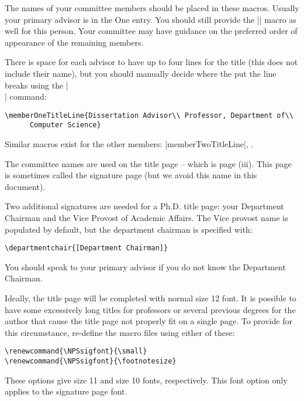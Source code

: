 The names of your committee members should be placed in these macros.  
Usually your primary advisor is in the One entry. You should still 
provide the |\thesisadvisor{[ADVISOR]}| macro as well for this person.  
Your committee may have guidance on the preferred order of appearance of the remaining members.  

There is space for each advisor to have up to four lines for the title 
(this does not include their name), but you should manually decide where 
the put the line breaks using the |\\| command:

\begin{Verbatim}
\memberOneTitleLine{Dissertation Advisor\\ Professor, Department of\\ 
      Computer Science}
\end{Verbatim}

Similar macros exist for the other members: |memberTwoTitleLine|, \etc.

The committee names are used on the title page -- which is page (iii).  This page is sometimes called the signature page (but we avoid this name in this document).

Two additional signatures are needed for a Ph.D. title page: your Department Chairman and the Vice Provost of Academic Affairs.  The Vice provost name is populated by default, but the department chairman is specified with:

\begin{Verbatim}
\departmentchair{[Department Chairman]}
\end{Verbatim}

You should speak to your primary advisor if you do not know the Department Chairman.  

Ideally, the title page will be completed with normal size 12 font.  It is possible to have some excessively long titles for professors or several previous degrees for the author that cause the title page not properly fit on a single page.  To provide for this circumstance, re-define the macro files using either of these:

\begin{Verbatim}
\renewcommand{\NPSsigfont}{\small}
\renewcommand{\NPSsigfont}{\footnotesize}
\end{Verbatim}

These options give size 11 and size 10 fonts, respectively.  This font option only applies to the signature page font.

